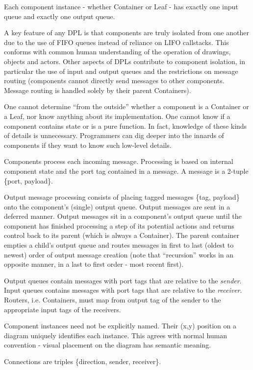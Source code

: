 \documentclass[10pt,anonymous,review]{acmart}
\begin{document}
Each component instance - whether Container or Leaf - has exactly one input queue and exactly one output queue.

A key feature of any DPL is that components are truly isolated from one another due to the use of FIFO queues instead of reliance on LIFO callstacks. This conforms with common human understanding of the operation of drawings, objects and actors. Other aspects of DPLs contribute to component isolation, in particular the use of input and output queues and the restrictions on message routing (components cannot directly send messages to other components. Message routing is handled solely by their parent Containers).

One cannot determine “from the outside” whether a component is a Container or a Leaf, nor know anything about its implementation. One cannot know if a component contains state or is a pure function. In fact, knowledge of these kinds of details is unnecessary. Programmers can dig deeper into the innards of components if they want to know such low-level details.

Components process each incoming message. Processing is based on internal component state and the port tag contained in a message. A message is a 2-tuple \{port, payload\}.

Output message processing consists of placing tagged messages \{tag, payload\} onto the component’s (single) output queue. Output messages are sent in a deferred manner. Output messages sit in a component’s output queue until the component has finished processing a step of its potential actions and returns control back to its parent (which is always a Container). The parent container empties a child’s output queue and routes messages in first to last (oldest to newest) order of output message creation (note that “recursion” works in an opposite manner, in a last to first order - most recent first).

Output queues contain messages with port tags that are relative to the \emph{sender}. Input queues contains messages with port tags that are relative to the \emph{receiver}. Routers, i.e. Containers, must map from output tag of the sender to the appropriate input tags of the receivers.

Component instances need not be explicitly named. Their (x,y) position on a diagram uniquely identifies each instance. This agrees with normal human convention - visual placement on the diagram has semantic meaning.


Connections are triples \{direction, sender, receiver\}.
\end{document}
